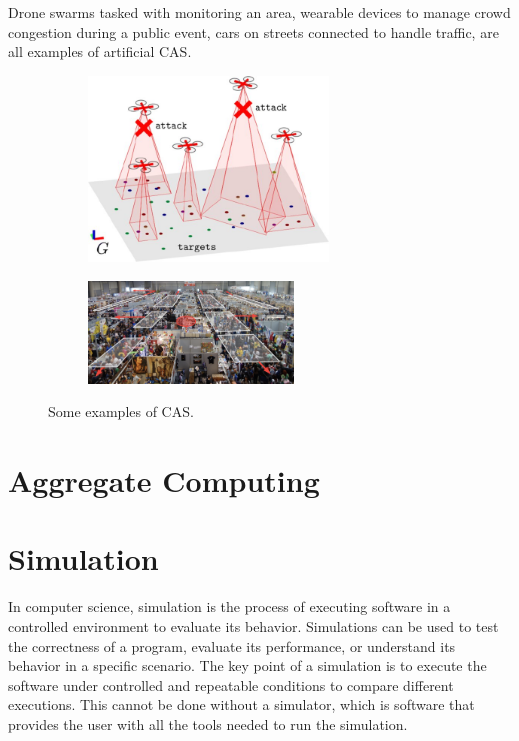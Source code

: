 \documentclass[12pt,a4paper,openright,twoside]{book}
\begin{document}
Drone swarms tasked with monitoring an area, wearable devices to manage crowd congestion during a public event, cars on streets connected to handle traffic, are all examples of artificial CAS. \cite{2}

\begin{figure}[t]
  \centering
  \begin{subfigure}[b]{0.49\textwidth}
      \centering
      \includegraphics[width=0.7\textwidth]{figures/swarm2.jpeg}
  \end{subfigure}

  \begin{subfigure}[b]{0.49\textwidth}
      \centering
      \includegraphics[width=0.6\textwidth]{figures/crowd.png}
  \end{subfigure}
  \caption{Some examples of CAS.}
\end{figure}

\section{Aggregate Computing}

\section{Simulation}

In computer science, simulation is the process of executing software in a controlled environment to evaluate its behavior. 
Simulations can be used to test the correctness of a program, evaluate its performance, or understand its behavior in a specific scenario. 
The key point of a simulation is to execute the software under controlled and repeatable conditions to compare different executions. 
This cannot be done without a simulator, which is software that provides the user with all the tools needed to run the simulation. \cite[]{argun2021simulation, bagrodia1998parsec}
\end{document}
